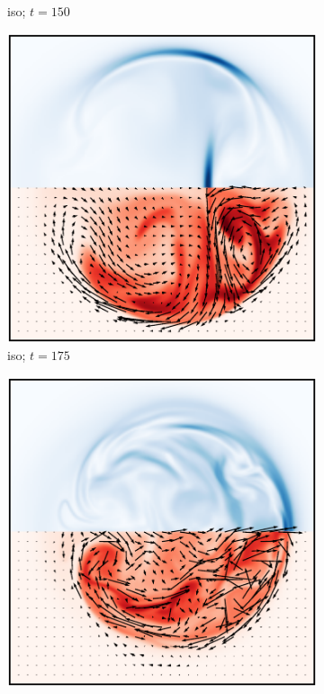 \begin{figure}[t]
\begin{subfigure}[t]{0.32\textwidth}
    \caption{iso; $t=150$}
    \label{fig:final_isotropic_current_density_0030}
  \end{subfigure}
  \hfill
  \begin{subfigure}[t]{0.32\textwidth}
    \centering
    \includegraphics[width=\linewidth]{slices/final_isotropic_current_density_0035.pdf}
    \caption{iso; $t=175$}
    \label{fig:final_isotropic_current_density_0035}
  \end{subfigure}
  \hfill
  \begin{subfigure}[t]{0.32\textwidth}
    \centering
    \includegraphics[width=\linewidth]{slices/final_switching_current_density_0025.pdf}

\end{subfigure}
\end{figure}

